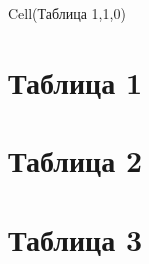 \documentclass[a4paper,11pt]{article}
\begin{document}
Cell(Таблица 1,1,0)
	\section{Таблица 1}
	\section{Таблица 2}

	\section{Таблица 3}
\end{document}
